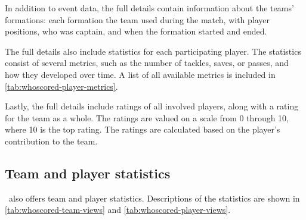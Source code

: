 In addition to event data, the full details contain information about the teams' formations: each formation the team used during the match, with player positions, who was captain, and when the formation started and ended.

The full details also include statistics for each participating player. The statistics consist of several metrics, such as the number of tackles, saves, or passes, and how they developed over time. A list of all available metrics is included in \cref{tab:whoscored-player-metrics}.

Lastly, the full details include ratings of all involved players, along with a rating for the team as a whole. The ratings are valued on a scale from 0 through 10, where 10 is the top rating. The ratings are calculated based on the player's contribution to the team.


\subsection{Team and player statistics}

\whoscored\ also offers team and player statistics. Descriptions of the statistics are shown in \cref{tab:whoscored-team-views} and \cref{tab:whoscored-player-views}.